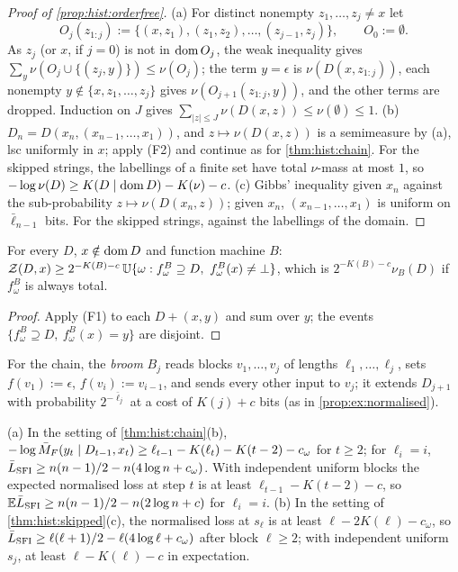 \begin{proof}[Proof of \cref{prop:hist:orderfree}]
(a) For distinct nonempty $z_1,\dots,z_j\ne x$ let
\[O_j(z_{1:j}):=\{(x,z_1),(z_1,z_2),\dots,(z_{j-1},z_j)\},\qquad O_0:=\emptyset.\]
As $z_j$ (or $x$, if $j=0$) is not in $\operatorname{dom} O_j$, the weak inequality gives $\sum_y\nu(O_j\cup\{(z_j,y)\})\le\nu(O_j)$; the term $y=\epsilon$ is $\nu(D(x,z_{1:j}))$, each nonempty $y\notin\{x,z_1,\dots,z_j\}$ gives $\nu(O_{j+1}(z_{1:j},y))$, and the other terms are dropped. Induction on $J$ gives $\sum_{|z|\le J}\nu(D(x,z))\le\nu(\emptyset)\le1$.
(b) $D_n=D(x_n,(x_{n-1},\dots,x_1))$, and $z\mapsto\nu(D(x,z))$ is a semimeasure by (a), lsc uniformly in $x$; apply (F2) and continue as for \cref{thm:hist:chain}. For the skipped strings, the labellings of a finite set have total $\nu$-mass at most $1$, so $-\log\nu(D)\ge K(D\mid\operatorname{dom} D)-K(\nu)-c$.
(c) Gibbs' inequality given $x_n$ against the sub-probability $z\mapsto\nu(D(x_n,z))$; given $x_n$, $(x_{n-1},\dots,x_1)$ is uniform on $\bar\ell_{n-1}$ bits. For the skipped strings, against the labellings of the domain.
\end{proof}

\begin{lemma}\label{lem:hist:broom}
For every $D$, $x\notin\operatorname{dom} D$ and function machine $B$: $\mathcal{Z}(D,x)\ge2^{-K(B)-c}\,\mathbb{U}\{\omega:f^B_\omega\supseteq D,\ f^B_\omega(x)\ne\bot\}$, which is $2^{-K(B)-c}\nu_B(D)$ if $f^B_\omega$ is always total.
\end{lemma}

\begin{proof}
Apply (F1) to each $D+(x,y)$ and sum over $y$; the events $\{f^B_\omega\supseteq D,\ f^B_\omega(x)=y\}$ are disjoint.
\end{proof}

For the chain, the \emph{broom} $B_j$ reads blocks $v_1,\dots,v_j$ of lengths $\ell_1,\dots,\ell_j$, sets $f(v_1):=\epsilon$, $f(v_i):=v_{i-1}$, and sends every other input to $v_j$; it extends $D_{j+1}$ with probability $2^{-\bar\ell_j}$ at a cost of $K(j)+c$ bits (as in \cref{prop:ex:normalised}).

\begin{proposition}\label{prop:hist:normchain}
(a) In the setting of \cref{thm:hist:chain}(b), $-\log\bar{M}_{F}(y_t\mid D_{t-1},x_t)\ge\ell_{t-1}-K(\ell_t)-K(t-2)-c_\omega$ for $t\ge2$; for $\ell_i=i$, $\bar{L}_{\mathrm{SFI}}\ge n(n-1)/2-n(4\log n+c_\omega)$. With independent uniform blocks the expected normalised loss at step $t$ is at least $\ell_{t-1}-K(t-2)-c$, so $\mathbb{E}\bar{L}_{\mathrm{SFI}}\ge n(n-1)/2-n(2\log n+c)$ for $\ell_i=i$.
(b) In the setting of \cref{thm:hist:skipped}(c), the normalised loss at $s_\ell$ is at least $\ell-2K(\ell)-c_\omega$, so $\bar{L}_{\mathrm{SFI}}\ge\ell(\ell+1)/2-\ell(4\log\ell+c_\omega)$ after block $\ell\ge2$; with independent uniform $s_j$, at least $\ell-K(\ell)-c$ in expectation.
\end{proposition}

